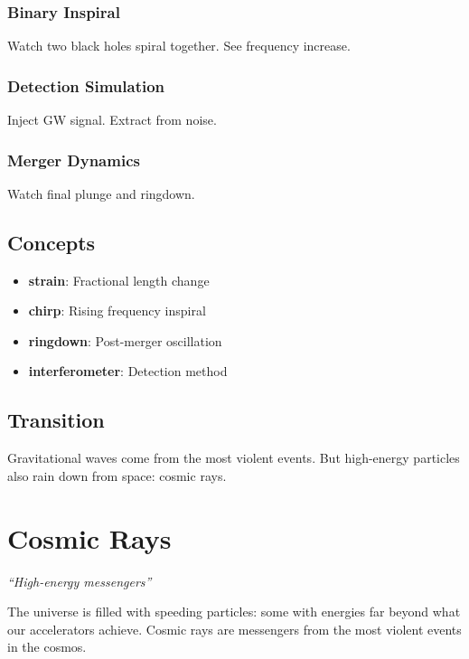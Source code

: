 \documentclass[
  11pt,
  letterpaper,
  twoside,
  openright]{book}
\providecommand{\tightlist}{%
  \setlength{\itemsep}{0pt}\setlength{\parskip}{0pt}}
\begin{document}
\subsection{Binary Inspiral}\label{binary-inspiral}

Watch two black holes spiral together. See frequency increase.

\subsection{Detection Simulation}\label{detection-simulation}

Inject GW signal. Extract from noise.

\subsection{Merger Dynamics}\label{merger-dynamics}

Watch final plunge and ringdown.

\section{Concepts}\label{concepts-33}

\begin{itemize}
\tightlist
\item
  \textbf{strain}: Fractional length change
\item
  \textbf{chirp}: Rising frequency inspiral
\item
  \textbf{ringdown}: Post-merger oscillation
\item
  \textbf{interferometer}: Detection method
\end{itemize}

\section{Transition}\label{transition-34}

Gravitational waves come from the most violent events. But high-energy
particles also rain down from space: cosmic rays.

\chapter{Cosmic Rays}\label{sec-cosmic-rays}

\emph{``High-energy messengers''}

\begin{tcolorbox}[enhanced jigsaw, leftrule=.75mm, title=\textcolor{quarto-callout-note-color}{\faInfo}\hspace{0.5em}{Key Revelation}, bottomrule=.15mm, opacityback=0, coltitle=black, arc=.35mm, colframe=quarto-callout-note-color-frame, colbacktitle=quarto-callout-note-color!10!white, colback=white, titlerule=0mm, breakable, bottomtitle=1mm, toptitle=1mm, rightrule=.15mm, toprule=.15mm, left=2mm, opacitybacktitle=0.6]

The universe is filled with speeding particles: some with energies far
beyond what our accelerators achieve. Cosmic rays are messengers from
the most violent events in the cosmos.

\end{tcolorbox}
\end{document}
